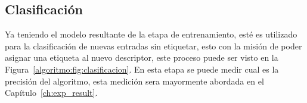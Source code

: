 		
	\subsection{Clasificación}
	\label{algoritmo:clasificacion}
		Ya teniendo el modelo resultante de la etapa de entrenamiento, esté es utilizado para la clasificación de nuevas entradas sin etiquetar, esto con la misión de poder asignar una etiqueta al nuevo descriptor, este proceso puede ser visto en la Figura~\ref{algoritmo:fig:clasificacion}. En esta etapa se puede medir cual es la precisión del algoritmo, esta medición sera mayormente abordada en el Capítulo~\ref{ch:exp_result}.
		
	
	
	
	
	